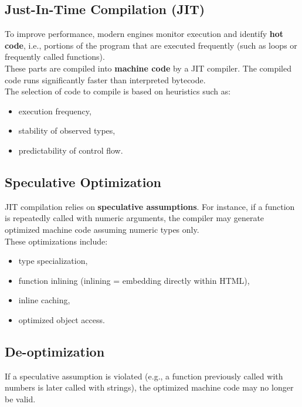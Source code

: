 \documentclass{scrbook}
\begin{document}
\subsection{Just-In-Time Compilation (JIT)}

To improve performance, modern engines monitor execution and identify \textbf{hot code}, i.e., portions of the program that are executed frequently (such as loops or frequently called functions).\\

These parts are compiled into \textbf{machine code} by a JIT compiler. The compiled code runs significantly faster than interpreted bytecode.\\

The selection of code to compile is based on heuristics such as:
\begin{itemize}
    \item execution frequency,
    \item stability of observed types,
    \item predictability of control flow.
\end{itemize}

\subsection{Speculative Optimization}

JIT compilation relies on \textbf{speculative assumptions}. For instance, if a function is repeatedly called with numeric arguments, the compiler may generate optimized machine code assuming numeric types only.\\

These optimizations include:
\begin{itemize}
    \item type specialization,
    \item function inlining (inlining = embedding directly within HTML),
    \item inline caching,
    \item optimized object access.
\end{itemize}

\subsection{De-optimization}

If a speculative assumption is violated (e.g., a function previously called with numbers is later called with strings), the optimized machine code may no longer be valid.\\
\end{document}
